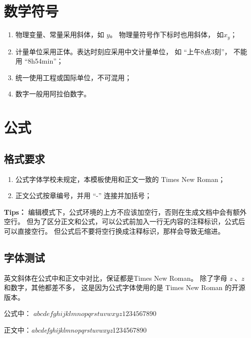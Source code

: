 \section{数学符号}

\begin{enumerate}
	\item 物理变量、常量采用斜体，如 $y$。 物理量符号作下标时也用斜体， 如$x_y$；
	\item 计量单位采用正体。表达时刻应采用中文计量单位，
	      如 ``上午8点3刻''， 不能用 ``8h54min''；
	\item 统一使用工程或国际单位，不可混用；
	\item 数字一般用阿拉伯数字。
\end{enumerate}

\section{公式}

\subsection{格式要求}

\begin{enumerate}
	\item 公式字体学校未规定，本模板使用和正文一致的 Times New Roman；
	\item 正文公式按章编号，并用 ``-'' 连接并加括号；
\end{enumerate}

\textbf{Tips：} 编辑模式下，公式环境的上方不应该加空行，否则在生成文档中会有额外空行。
但为了区分正文和公式，可以公式前加入一行无内容的注释标识，公式后可以直接空行。
但公式后不要将空行换成注释标识，那样会导致无缩进。

\subsection{字体测试}

英文斜体在公式中和正文中对比，保证都是Times New Roman。
除了字母 \textit{z} 、$z$和数字，其他都差不多，
这是因为公式字体使用的是 Times New Roman 的开源版本。

公式中： $abcdefghijklmnopqrstuvwxyz1234567890$

正文中：\textit{abcdefghijklmnopqrstuvwxyz}1234567890


